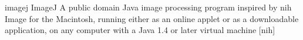 \newglsXsoftware%
{imagej}%
{ImageJ}%
{A public domain Java image processing program inspired by \gls{nih} Image for the Macintosh, running either as an online applet or as a downloadable application, on any computer with a Java 1.4 or later virtual machine \cite{website:ImageJ}}%
[nih]%